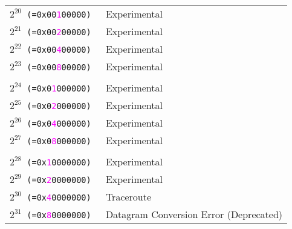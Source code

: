 \documentclass[documentation]{subfiles}
\begin{document}
\begin{longtable}{>{\tt}rl}
    $2^{20}$ (=0x00\textcolor{magenta}{1}00000) & Experimental \\
    $2^{21}$ (=0x00\textcolor{magenta}{2}00000) & Experimental\\
    $2^{22}$ (=0x00\textcolor{magenta}{4}00000) & Experimental \\
    $2^{23}$ (=0x00\textcolor{magenta}{8}00000) & Experimental \\
    \\
    $2^{24}$ (=0x0\textcolor{magenta}{1}000000) & Experimental \\
    $2^{25}$ (=0x0\textcolor{magenta}{2}000000) & Experimental \\
    $2^{26}$ (=0x0\textcolor{magenta}{4}000000) & Experimental \\
    $2^{27}$ (=0x0\textcolor{magenta}{8}000000) & Experimental \\
    \\
    $2^{28}$ (=0x\textcolor{magenta}{1}0000000) & Experimental \\
    $2^{29}$ (=0x\textcolor{magenta}{2}0000000) & Experimental \\
    $2^{30}$ (=0x\textcolor{magenta}{4}0000000) & Traceroute \\
    $2^{31}$ (=0x\textcolor{magenta}{8}0000000) & Datagram Conversion Error (Deprecated) \\
    \bottomrule
\end{longtable}
\end{document}
